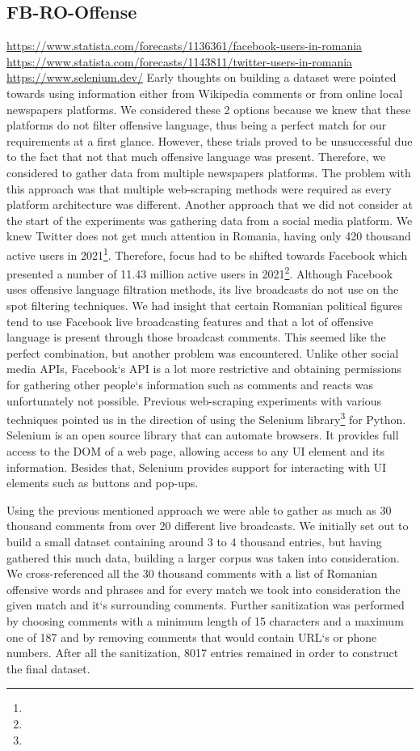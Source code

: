 \documentclass[12pt,a4paper]{report}
\begin{document}
\subsection{FB-RO-Offense}
\label{section:FB-RO-Offense}
\urldef{\urlStatistaFacebook}\url{https://www.statista.com/forecasts/1136361/facebook-users-in-romania}
\urldef{\urlStatistaTwitter}\url{https://www.statista.com/forecasts/1143811/twitter-users-in-romania}
\urldef{\urlSelenium}\url{https://www.selenium.dev/}
Early thoughts on building a dataset were pointed towards using information either from Wikipedia comments or from online local newspapers platforms. We considered these 2 options because we knew that these platforms do not filter offensive language, thus being a perfect match for our requirements at a first glance. However, these trials proved to be unsuccessful due to the fact that not that much offensive language was present. Therefore, we considered to gather data from multiple newspapers platforms. The problem with this approach was that multiple web-scraping methods were required as every platform architecture was different. Another approach that we did not consider at the start of the experiments was gathering data from a social media platform. We knew Twitter does not get much attention in Romania, having only 420 thousand active users in 2021\footnote{\urlStatistaTwitter}. Therefore, focus had to be shifted towards Facebook which presented a number of 11.43 million active users in 2021\footnote{\urlStatistaFacebook}. Although Facebook uses offensive language filtration methods, its live broadcasts do not use on the spot filtering techniques. We had insight that certain Romanian political figures tend to use Facebook live broadcasting features and that a lot of offensive language is present through those broadcast comments. This seemed like the perfect combination, but another problem was encountered. Unlike other social media APIs, Facebook`s API is a lot more restrictive and obtaining permissions for gathering other people`s information such as comments and reacts was unfortunately not possible. Previous web-scraping experiments with various techniques pointed us in the direction of using the Selenium library\footnote{\urlSelenium} for Python. Selenium is an open source library that can automate browsers. It provides full access to the DOM of a web page, allowing access to any UI element and its information. Besides that, Selenium provides support for interacting with UI elements such as buttons and pop-ups.

Using the previous mentioned approach we were able to gather as much as 30 thousand comments from over 20 different live broadcasts. We initially set out to build a small dataset containing around 3 to 4 thousand entries, but having gathered this much data, building a larger corpus was taken into consideration. We cross-referenced all the 30 thousand comments with a list of Romanian offensive words and phrases and for every match we took into consideration the given match and it`s surrounding comments. Further sanitization was performed by choosing comments with a minimum length of 15 characters and a maximum one of 187 and by removing comments that would contain URL`s or phone numbers. After all the sanitization, 8017 entries remained in order to construct the final dataset.
\end{document}
